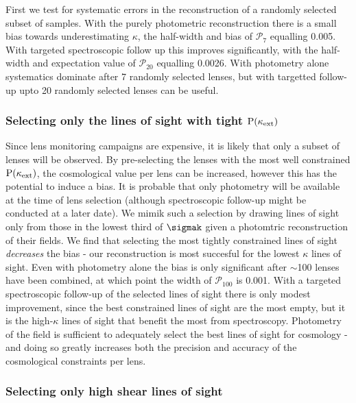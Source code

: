 \documentclass[useAMS,usenatbib]{mn2e}
\begin{document}
First we test for systematic errors in the reconstruction of a randomly selected subset of samples. With the purely photometric reconstruction there is a small bias towards underestimating $\kappa$, the half-width and bias of $\mathcal{P}_{7}$ equalling 0.005. With targeted spectroscopic follow up this improves significantly, with the half-width and expectation value of $\mathcal{P}_{20}$ equalling 0.0026. With photometry alone systematics dominate after 7 randomly selected lenses, but with targetted follow-up upto 20 randomly selected lenses can be useful.

\subsubsection{Selecting only the lines of sight with tight ${\rm P}(\kappa_{\rm ext})$}
\label{sec:tightPDF}

Since lens monitoring campaigns are expensive, it is likely that only a subset of lenses will be observed. By pre-selecting the lenses with the most well constrained ${\rm P}(\kappa_{\rm ext})$, the cosmological value per lens can be increased, however this has the potential to induce a bias. It is probable that only photometry will be available at the time of lens selection (although spectroscopic follow-up might be conducted at a later date). We mimik such a selection by drawing lines of sight only from those in the lowest third of $\sigmak$ given a photomtric reconstruction of their fields. We find that selecting the most tightly constrained lines of sight {\it decreases} the bias - our reconstruction is most succesful for the lowest $\kappa$ lines of sight. Even with photometry alone the bias is only significant after $\sim$100 lenses have been combined, at which point the width of $\mathcal{P}_{100}$ is 0.001. With a targeted spectroscopic follow-up of the selected lines of sight there is only modest improvement, since the best constrained lines of sight are the most empty, but it is the high-$\kappa$ lines of sight that benefit the most from spectroscopy. Photometry of the field is sufficient to adequately select the best lines of sight for cosmology - and doing so greatly increases both the precision and accuracy of the cosmological constraints per lens.

\subsubsection{Selecting only high shear lines of sight}
\end{document}
